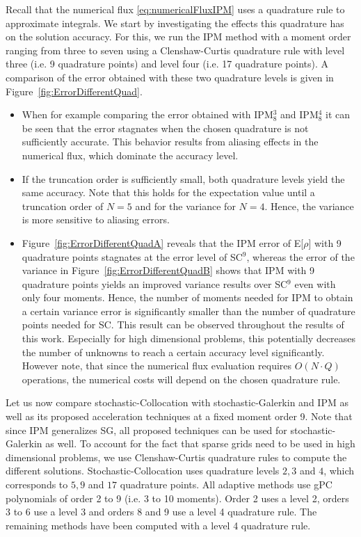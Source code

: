Recall that the numerical flux \eqref{eq:numericalFluxIPM} uses a quadrature rule to approximate integrals. We start by investigating the effects this quadrature has on the solution accuracy. For this, we run the IPM method with a moment order ranging from three to seven using a Clenshaw-Curtis quadrature rule with level three (i.e. 9 quadrature points) and level four (i.e. 17 quadrature points). A comparison of the error obtained with these two quadrature levels is given in Figure~\ref{fig:ErrorDifferentQuad}. 
\begin{itemize}
\item When for example comparing the error obtained with IPM$_8^3$ and IPM$_8^4$ it can be seen that the error stagnates when the chosen quadrature is not sufficiently accurate. This behavior results from aliasing effects in the numerical flux, which dominate the accuracy level.
\item If the truncation order is sufficiently small, both quadrature levels yield the same accuracy. Note that this holds for the expectation value until a truncation order of $N=5$ and for the variance for $N=4$. Hence, the variance is more sensitive to aliasing errors.
\item Figure~\ref{fig:ErrorDifferentQuadA} reveals that the IPM error of E[$\rho$] with 9 quadrature points stagnates at the error level of SC$^9$, whereas the error of the variance in Figure~\ref{fig:ErrorDifferentQuadB} shows that IPM with 9 quadrature points yields an improved variance results over SC$^9$ even with only four moments. Hence, the number of moments needed for IPM to obtain a certain variance error is significantly smaller than the number of quadrature points needed for SC. This result can be observed throughout the results of this work. Especially for high dimensional problems, this potentially decreases the number of unknowns to reach a certain accuracy level significantly. However note, that since the numerical flux evaluation requires $O(N\cdot Q)$ operations, the numerical costs will depend on the chosen quadrature rule.
\end{itemize}
Let us now compare stochastic-Collocation with stochastic-Galerkin and IPM as well as its proposed acceleration techniques at a fixed moment order 9. Note that since IPM generalizes SG, all proposed techniques can be used for stochastic-Galerkin as well. To account for the fact that sparse grids need to be used in high dimensional problems, we use Clenshaw-Curtis quadrature rules to compute the different solutions. Stochastic-Collocation uses quadrature levels $2,3$ and $4$, which corresponds to $5,9$ and $17$ quadrature points. All adaptive methods use gPC polynomials of order 2 to 9 (i.e. 3 to 10 moments). Order 2 uses a level 2, orders 3 to 6 use a level 3 and orders 8 and 9 use a level 4 quadrature rule. The remaining methods have been computed with a level 4 quadrature rule. 

